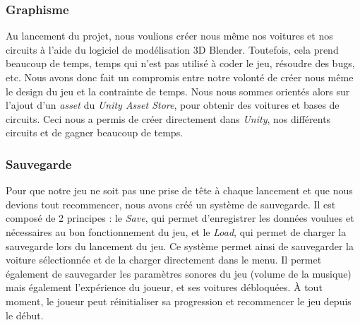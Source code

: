 \documentclass[a4paper,12pt]{article}
\begin{document}
            \subsubsection{Graphisme}
                Au lancement du projet, nous voulions créer nous même nos voitures et nos circuits à 
                l'aide du logiciel de modélisation 3D Blender. Toutefois, cela prend beaucoup de temps,
                temps qui n'est pas utilisé à coder le jeu, résoudre des bugs, etc. Nous avons donc fait
                un compromis entre notre volonté de créer nous même le design du jeu et la contrainte de
                temps. Nous nous sommes orientés alors sur l'ajout d'un \textit{asset} du \textsl{Unity
                Asset Store}, pour obtenir des voitures et bases de circuits. Ceci nous a permis de
                créer directement dans \textsl{Unity}, nos différents circuits et de gagner beaucoup de 
                temps. 
            
            \subsubsection{Sauvegarde}
                Pour que notre jeu ne soit pas une prise de tête à chaque lancement et que nous devions tout recommencer, nous 
                avons créé un système de sauvegarde. Il est composé de 2 principes : le \textsl{Save}, qui permet 
                d'enregistrer les données voulues et nécessaires au bon fonctionnement du jeu, et le 
                \textsl{Load}, qui permet de charger la sauvegarde lors du lancement du jeu. Ce système permet
                ainsi de sauvegarder la voiture sélectionnée et de la charger directement dans le menu.
                Il permet également de sauvegarder les paramètres sonores du jeu (volume de la musique) mais également 
                l'expérience du joueur, et ses voitures débloquées. À tout moment, le joueur peut réinitialiser sa 
                progression et recommencer le 
                jeu depuis le début.
\end{document}
